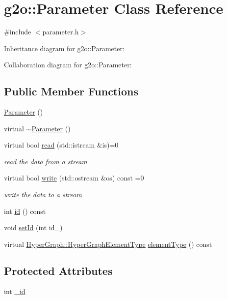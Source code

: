 \hypertarget{classg2o_1_1Parameter}{}\section{g2o\+:\+:Parameter Class Reference}
\label{classg2o_1_1Parameter}


{\ttfamily \#include $<$parameter.\+h$>$}



Inheritance diagram for g2o\+:\+:Parameter\+:


Collaboration diagram for g2o\+:\+:Parameter\+:
\subsection*{Public Member Functions}
\begin{DoxyCompactItemize}
\item 
\hyperlink{classg2o_1_1Parameter_a34ef4c50461a0ab0ae9bd26944fac4de}{Parameter} ()
\item 
virtual \hyperlink{classg2o_1_1Parameter_a03a4d78df10d25ddf14a52872f872913}{$\sim$\+Parameter} ()
\item 
virtual bool \hyperlink{classg2o_1_1Parameter_a77d9d88d8bde52198631fcd0fc4c9d0e}{read} (std\+::istream \&is)=0
\begin{DoxyCompactList}\small\item\em read the data from a stream \end{DoxyCompactList}\item 
virtual bool \hyperlink{classg2o_1_1Parameter_a18e66a40cd71a4da2ab9be5ba318abb7}{write} (std\+::ostream \&os) const =0
\begin{DoxyCompactList}\small\item\em write the data to a stream \end{DoxyCompactList}\item 
int \hyperlink{classg2o_1_1Parameter_a73cfeeee19f22b56391c995108cd89eb}{id} () const 
\item 
void \hyperlink{classg2o_1_1Parameter_a2872398ab7d8c95d0a1b5ca5bbfae461}{set\+Id} (int id\+\_\+)
\item 
virtual \hyperlink{classg2o_1_1HyperGraph_af603119d5d3475aed6e34ee9d701b69e}{Hyper\+Graph\+::\+Hyper\+Graph\+Element\+Type} \hyperlink{classg2o_1_1Parameter_aff546d31d4c558df761a3cec06a91bf8}{element\+Type} () const 
\end{DoxyCompactItemize}
\subsection*{Protected Attributes}
\begin{DoxyCompactItemize}
\item 
int \hyperlink{classg2o_1_1Parameter_a602d08079c6a3a5f868e41a102e1db0b}{\+\_\+id}
\end{DoxyCompactItemize}


